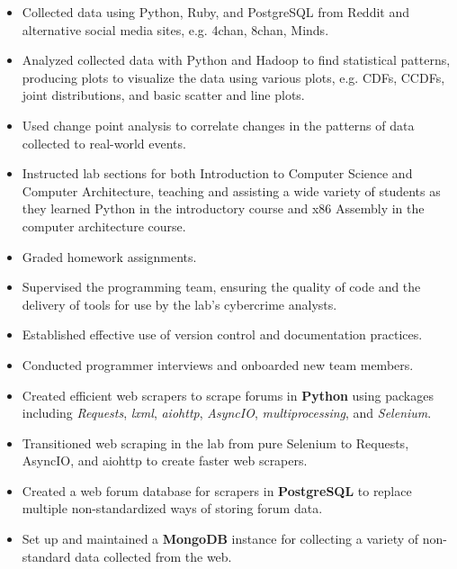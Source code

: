 \documentclass[10pt]{setzerresume}
\begin{document}

  \begin{itemize}[nosep]%
    \item Collected data using Python, Ruby, and PostgreSQL from Reddit and alternative social media sites, e.g. 4chan, 8chan, Minds.
    \item Analyzed collected data with Python and Hadoop to find statistical patterns, producing plots to visualize the data using various plots, e.g. CDFs, CCDFs, joint distributions, and basic scatter and line plots.
    \item Used change point analysis to correlate changes in the patterns of data collected to real-world events.
    \item Instructed lab sections for both Introduction to Computer Science and Computer Architecture, teaching and assisting a wide variety of students as they learned Python in the introductory course and x86 Assembly in the computer architecture course.
    \item Graded homework assignments.
  \end{itemize}



  \begin{itemize}[nosep]%

    \item Supervised the programming team, ensuring the quality of code and the delivery of tools for use by the lab's cybercrime analysts.
    \item Established effective use of version control and documentation practices.
    \item Conducted programmer interviews and onboarded new team members.
    \item Created efficient web scrapers to scrape forums in \textbf{Python} using packages including \textit{Requests}, \textit{lxml}, \textit{aiohttp}, \textit{AsyncIO}, \textit{multiprocessing}, and \textit{Selenium}.
    \item Transitioned web scraping in the lab from pure Selenium to Requests, AsyncIO, and aiohttp to create faster web scrapers.
    \item Created a web forum database for scrapers in \textbf{PostgreSQL} to replace multiple non-standardized ways of storing forum data.
    \item Set up and maintained a \textbf{MongoDB} instance for collecting a variety of non-standard data collected from the web.
          
  \end{itemize}
\end{document}
